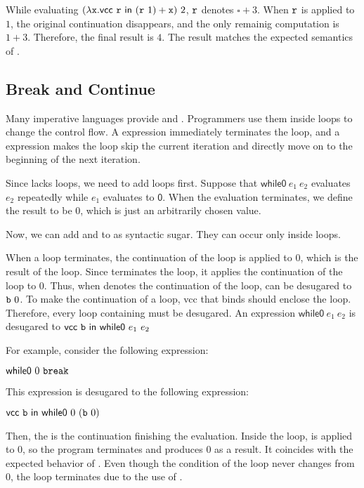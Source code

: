 While evaluating $(\lambda \texttt{x}.\textsf{vcc}\ \texttt{r}\ \textsf{in}\ (\texttt{r}\ 1)+\texttt{x})\ 2$,
$\texttt{r}$ denotes $\square+3$. When $\texttt{r}$ is applied to $1$,
the original continuation disappears, and the only remainig computation is
$1+3$. Therefore, the final result is $4$. The result matches the expected
semantics of .

\subsection{Break and Continue}

Many imperative languages provide  and . Programmers
use them inside loops to change the control flow. A  expression
immediately terminates the loop, and a  expression makes the
loop skip the current iteration and directly move on to the beginning of the
next iteration.

Since \lang lacks loops, we need to add loops first.
Suppose that $\textsf{while0}\ e_1\ e_2$ evaluates $e_2$ repeatedly while $e_1$
evaluates to $\textsf{0}$. When the evaluation terminates, we define the result
to be $0$, which is just an arbitrarily chosen value.

Now, we can add  and  to \lang as syntactic
sugar. They can occur only inside loops.

When a loop terminates, the continuation of the loop is applied to $0$, which is
the result of the loop. Since  terminates the loop, it
applies the continuation of the loop to $0$. Thus, when  denotes the
continuation of the loop,  can be desugared to $\texttt{b}\ 0$.
To make  the continuation of a loop, \textsf{vcc} that binds 
should enclose the loop. Therefore, every loop containing  must be
desugared. An expression $\textsf{while0}\ e_1\ e_2$ is desugared to
$\evcc{\code{b}}{\textsf{while0}\ e_1\ e_2}$

For example, consider the following expression:

$\textsf{while0}\ 0\ \code{break}$

This expression is desugared to the following expression:

$\evcc{\code{b}}{\textsf{while0}\ 0\ (\code{b}\ 0)}$

Then, the  is the continuation finishing the evaluation.
Inside the loop,  is applied to $0$, so the program terminates and
produces $0$ as a result. It coincides with the expected behavior of .
Even though the condition of the loop never changes from $0$, the loop
terminates due to the use of .

